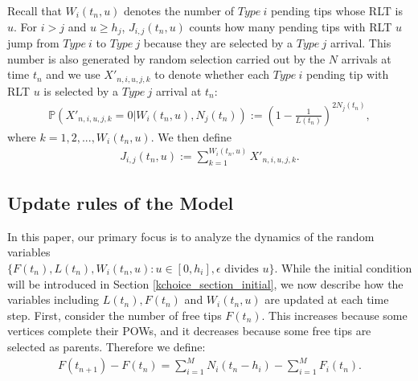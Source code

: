 \documentclass[12pt]{article}
\def\P{\mathbb{P}}
\numberwithin{equation}{section}  %
\begin{document}
Recall that $W_i(t_n,u)$ denotes the number of {$Type\ i$} pending tips whose RLT is $u$. For $i>j$ and $u\geq h_j$, $J_{i,j}(t_n, u)$ counts how many pending tips with RLT $u$ jump from {$Type\ i$} to {$Type\ j$} because they are selected by a {$Type\ j$} arrival. This number is also generated by random selection carried out by the $N$ arrivals at time $t_n$ and we use $X'_{n,i,u,j,k}$ to denote whether each {$Type\ i$} pending tip with RLT $u$ is selected by a {$Type\ j$} arrival at $t_n$:
\begin{align*}
\P(X'_{n,i,u,j,k}=0|W_i(t_n, u),N_j(t_n)):=\left(1 - \frac{1}{L(t_n)}\right)^{2 N_{j}(t_n)},
\end{align*}
where $k=1,2,...,W_i(t_n, u)$. We then define
\begin{align}
J_{i,j}(t_n, u)  :=  \sum_{k=1}^{W_i(t_n, u)} X'_{n,i,u,j,k}.\label{kchoice_distribution_J}
\end{align}

\subsection{Update rules of the Model}\label{kchoice_section_updaterule}
In this paper, our primary focus is to analyze the dynamics of the random variables\\$\{F(t_n),L(t_n), W_{i}(t_n,u):u\in[0,h_i],\epsilon\text{ divides } u\}$. While the initial condition will be introduced in Section \ref{kchoice_section_initial}, we now describe how the variables including $L(t_n), F(t_n)$ and $W_i(t_n,u)$ are updated at each time step. First, consider the number of free tips $F(t_n)$.
This increases because some vertices complete their POWs, and it decreases because some free tips are selected
as parents. Therefore we define:
\begin{align}
F(t_{n+1}) - F(t_n) = \sum_{i=1}^{M} N_i(t_n-h_i)-\sum_{i=1}^{M}F_i(t_n).\label{kchoice_evo_F}
\end{align}
\end{document}
